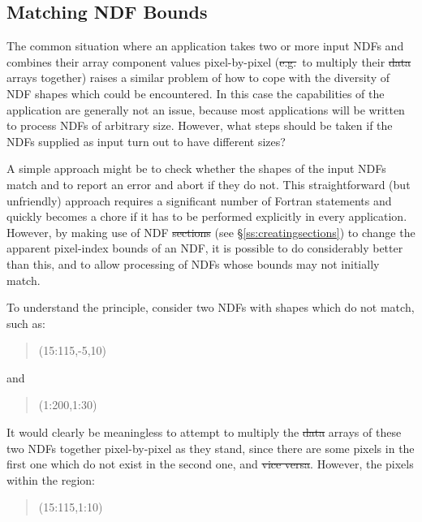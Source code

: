 \subsection{\label{ss:mbnd}Matching NDF Bounds}

The common situation where an application takes two or more input NDFs and
combines their array component values pixel-by-pixel (\st{e.g.}\ to
multiply their \st{data\/} arrays together) raises a similar problem of how
to cope with the diversity of NDF shapes which could be encountered. 
In this case the capabilities of the application are generally not an issue,
because most applications will be written to process NDFs of arbitrary size. 
However, what steps should be taken if the NDFs supplied as input turn out
to have different sizes? 

A simple approach might be to check whether the shapes of the input NDFs
match and to report an error and abort if they do not. 
This straightforward (but unfriendly) approach requires a significant number
of Fortran statements and quickly becomes a chore if it has to be performed
explicitly in every application. 
However, by making use of NDF \st{sections\/} (see
\S\ref{ss:creatingsections}) to change the apparent pixel-index bounds of an
NDF, it is possible to do considerably better than this, and to allow
processing of NDFs whose bounds may not initially match. 

To understand the principle, consider two NDFs with shapes which do not 
match, such as:

\small
\begin{quote}
\begin{center}
(15:115,-5,10)
\end{center}
\end{quote}
\normalsize

and

\small
\begin{quote}
\begin{center}
(1:200,1:30)
\end{center}
\end{quote}
\normalsize

It would clearly be meaningless to attempt to multiply the \st{data\/} arrays
of these two NDFs together pixel-by-pixel as they stand, since there are
some pixels in the first one which do not exist in the second one, and \st{vice versa}. 
However, the pixels within the region:

\small
\begin{quote}
\begin{center}
(15:115,1:10)
\end{center}
\end{quote}
\normalsize

